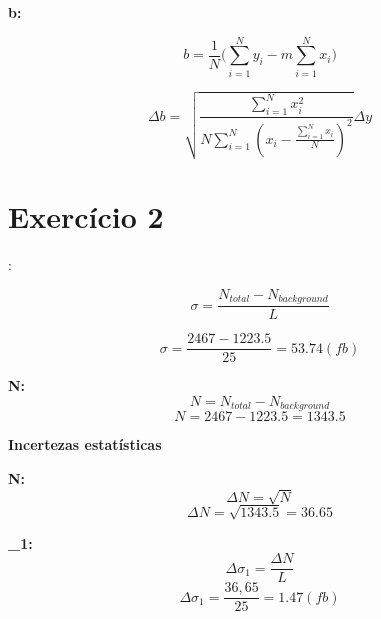 \documentclass{article}
\begin{document}
{        %
            \textbf{b:}
            \vspace{0.2cm}
  
            {\Large
               \[ b = \frac{1}{N}({\sum_{i=1}^{N} y_i - m \sum_{i=1}^{N} x_i)}\] 
             
             \vspace{0.2 cm}
          
               \[\Delta b = \sqrt{\frac{\sum_{i=1}^Nx_i^2}{N \sum_{i=1}^N (x_i - \frac{\sum_{i=1}^N x_i}{N})^2}} \Delta y\]

                             
            }
    \newpage
       {\section*{Exercício 2}}
       {\Large 
          {\sigma: }\\
          {\[ \sigma = \frac{N_{total} - N_{background}}{L}\]
          
           \vspace{0.2cm}
           
           \[ \sigma = \frac {2467 - 1223.5}{25} = 53.74 (fb) \]

           \vspace{1cm}

           \textbf{N:}
           \[ N = N_{total} - N_{background} \]
           \vspace{0.2 cm}
           \[ N = 2467 - 1223.5 = 1343.5\]

           \vspace{1cm}
           
           \textbf{Incertezas estatísticas}

           \vspace{1cm}

           \textbf{\Delta N:}\\
           \[ \Delta N = \sqrt{N} \]
           \vspace{0.2 cm}
           \[ \Delta N = \sqrt{1343.5} = 36.65 \]
           
           \vspace{1cm}
           
           \textbf{\Delta \sigma_1:}\\   
           \[ \Delta \sigma_1 = \frac{ \Delta N}{L}\]
           \vspace{0.2 cm}
           \[ \Delta \sigma_1 = \frac{36,65}{25} = 1.47 (fb)\]
       
}}}
\end{document}
